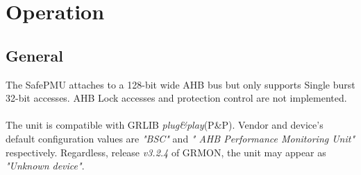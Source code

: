 \section{Operation}
\label{chapter2}
\subsection{General}
The SafePMU attaches to a 128-bit wide AHB bus but only supports Single burst 32-bit accesses. AHB Lock accesses and protection control are not implemented.\\
\\
The unit is compatible with GRLIB \textit{plug\&play}(P\&P). Vendor and device's default configuration values are  \textit{"BSC"} and \textit{" AHB Performance Monitoring Unit"} respectively. Regardless, release  \textit{v3.2.4}  of GRMON, the unit may appear as \textit{"Unknown device"}.
